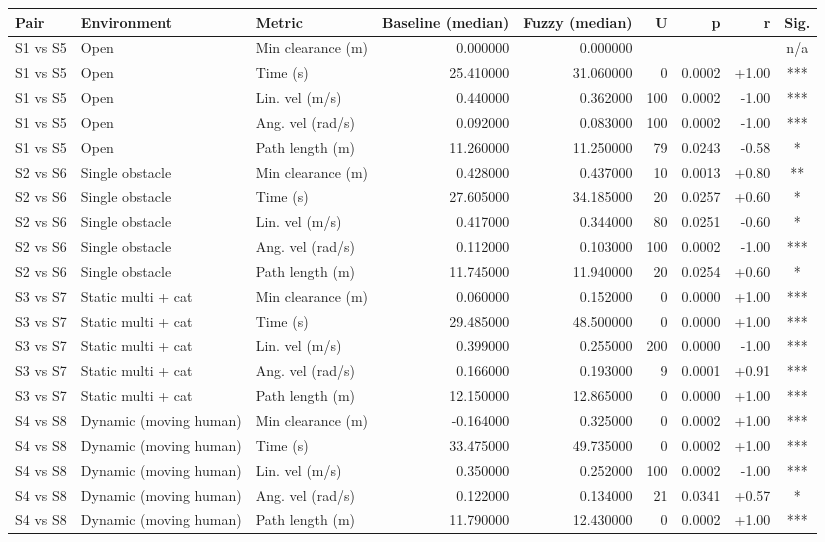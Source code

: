 \begin{tabular}{lllrrrrrc}
\toprule
Pair & Environment & Metric & Baseline (median) & Fuzzy (median) & U & p & r & Sig. \\
\midrule
S1 vs S5 & Open & Min clearance (m) & 0.000000 & 0.000000 &  &  &  & n/a \\
S1 vs S5 & Open & Time (s) & 25.410000 & 31.060000 & 0 & 0.0002 & +1.00 & *** \\
S1 vs S5 & Open & Lin. vel (m/s) & 0.440000 & 0.362000 & 100 & 0.0002 & -1.00 & *** \\
S1 vs S5 & Open & Ang. vel (rad/s) & 0.092000 & 0.083000 & 100 & 0.0002 & -1.00 & *** \\
S1 vs S5 & Open & Path length (m) & 11.260000 & 11.250000 & 79 & 0.0243 & -0.58 & * \\
S2 vs S6 & Single obstacle & Min clearance (m) & 0.428000 & 0.437000 & 10 & 0.0013 & +0.80 & ** \\
S2 vs S6 & Single obstacle & Time (s) & 27.605000 & 34.185000 & 20 & 0.0257 & +0.60 & * \\
S2 vs S6 & Single obstacle & Lin. vel (m/s) & 0.417000 & 0.344000 & 80 & 0.0251 & -0.60 & * \\
S2 vs S6 & Single obstacle & Ang. vel (rad/s) & 0.112000 & 0.103000 & 100 & 0.0002 & -1.00 & *** \\
S2 vs S6 & Single obstacle & Path length (m) & 11.745000 & 11.940000 & 20 & 0.0254 & +0.60 & * \\
S3 vs S7 & Static multi + cat & Min clearance (m) & 0.060000 & 0.152000 & 0 & 0.0000 & +1.00 & *** \\
S3 vs S7 & Static multi + cat & Time (s) & 29.485000 & 48.500000 & 0 & 0.0000 & +1.00 & *** \\
S3 vs S7 & Static multi + cat & Lin. vel (m/s) & 0.399000 & 0.255000 & 200 & 0.0000 & -1.00 & *** \\
S3 vs S7 & Static multi + cat & Ang. vel (rad/s) & 0.166000 & 0.193000 & 9 & 0.0001 & +0.91 & *** \\
S3 vs S7 & Static multi + cat & Path length (m) & 12.150000 & 12.865000 & 0 & 0.0000 & +1.00 & *** \\
S4 vs S8 & Dynamic (moving human) & Min clearance (m) & -0.164000 & 0.325000 & 0 & 0.0002 & +1.00 & *** \\
S4 vs S8 & Dynamic (moving human) & Time (s) & 33.475000 & 49.735000 & 0 & 0.0002 & +1.00 & *** \\
S4 vs S8 & Dynamic (moving human) & Lin. vel (m/s) & 0.350000 & 0.252000 & 100 & 0.0002 & -1.00 & *** \\
S4 vs S8 & Dynamic (moving human) & Ang. vel (rad/s) & 0.122000 & 0.134000 & 21 & 0.0341 & +0.57 & * \\
S4 vs S8 & Dynamic (moving human) & Path length (m) & 11.790000 & 12.430000 & 0 & 0.0002 & +1.00 & *** \\
\bottomrule
\end{tabular}
